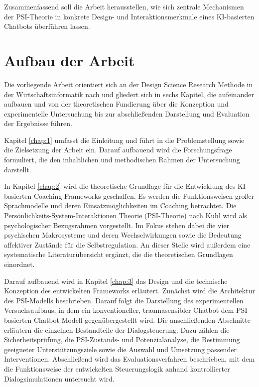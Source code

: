 Zusammenfassend soll die Arbeit herausstellen, wie sich zentrale Mechanismen der PSI-Theorie in konkrete Design- und Interaktionsmerkmale eines KI-basierten Chatbots überführen lassen. 

\section{Aufbau der Arbeit}

Die vorliegende Arbeit orientiert sich an der Design Science Research Methode in der Wirtschaftsinformatik nach \cite{peffers2007design} und gliedert sich in sechs Kapitel, die aufeinander aufbauen und von der theoretischen Fundierung über die Konzeption und experimentelle Untersuchung bis zur abschließenden Darstellung und Evaluation der Ergebnisse führen.

Kapitel \ref{chap:1} umfasst die Einleitung und führt in die Problemstellung sowie die Zielsetzung der Arbeit ein. Darauf aufbauend wird die Forschungsfrage formuliert, die den inhaltlichen und methodischen Rahmen der Untersuchung darstellt.

In Kapitel \ref{chap:2} wird die theoretische Grundlage für die Entwicklung des KI-basierten Coaching-Frameworks geschaffen. Es werden die Funktionsweisen großer Sprachmodelle und deren Einsatzmöglichkeiten im Coaching betrachtet. Die Persönlichkeits-System-Interaktionen Theorie (PSI-Theorie) nach Kuhl wird als psychologischer Bezugsrahmen vorgestellt. Im Fokus stehen dabei die vier psychischen Makrosysteme und deren Wechselwirkungen sowie die Bedeutung affektiver Zustände für die Selbstregulation. An dieser Stelle wird außerdem eine systematische Literaturübersicht ergänzt, die die theoretischen Grundlagen einordnet.

Darauf aufbauend wird in Kapitel \ref{chap:3} das Design und die technische Konzeption des entwickelten Frameworks erläutert. Zunächst wird die Architektur des PSI-Modells beschrieben. Darauf folgt die Darstellung des experimentellen Versuchsaufbaus, in dem ein konventioneller, traumasensibler Chatbot dem PSI-basierten Chatbot-Modell gegenübergestellt wird. Die anschließenden Abschnitte erläutern die einzelnen Bestandteile der Dialogsteuerung. Dazu zählen die Sicherheitsprüfung, die PSI-Zustands- und Potenzialanalyse, die Bestimmung geeigneter Unterstützungsziele sowie die Auswahl und Umsetzung passender Interventionen. Abschließend wird das Evaluationsverfahren beschrieben, mit dem die Funktionsweise der entwickelten Steuerungslogik anhand kontrollierter Dialogsimulationen untersucht wird.

